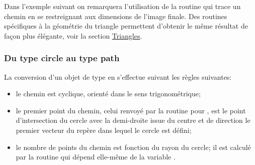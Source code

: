 \documentclass[pdftex]{article}
\begin{document}
%
Dans l'exemple suivant on remarquera l'utilisation de la routine
 qui trace un chemin en se restreignant aux dimensions de l'image
finale.
Des routines spécifiques à la géométrie du triangle permettent
d'obtenir le même résultat de façon plus élégante, voir la section \href{#section.triangle}{Triangles}.

\subsubsection{\texorpdfstring{Du type \og{}circle\fg{} au type
    \og{}path\fg{}}{Du type «circle» au type «path»}}
La conversion d'un objet de type  en 
s'effectue suivant les règles suivantes:
\begin{itemize}
\item le chemin est cyclique, orienté dans le sens trigonométrique;
\item le premier point du chemin, celui renvoyé par la
  routine  pour , est le
  point d'intersection du cercle avec la demi-droite issue du centre
  et de direction \og{}le premier vecteur du repère dans lequel le
  cercle est défini\fg{};
\item le nombre de points du chemin est fonction du rayon du cercle; il
  est calculé par la routine\linebreak
  qui dépend elle-même de la variable
  .
\end{itemize}
\end{document}
